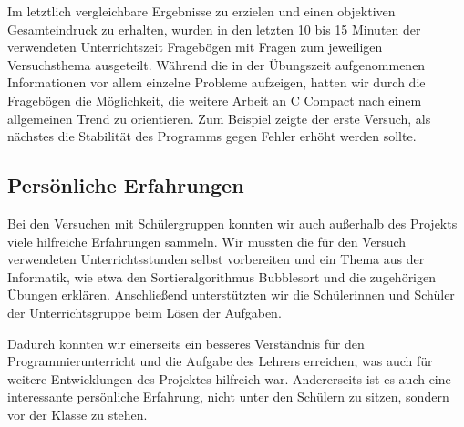 Im letztlich vergleichbare Ergebnisse zu erzielen und einen objektiven Gesamteindruck zu erhalten, wurden in den letzten 10 bis 15 Minuten der verwendeten Unterrichtszeit Fragebögen mit Fragen zum jeweiligen Versuchsthema ausgeteilt. Während die in der Übungszeit aufgenommenen Informationen vor allem einzelne Probleme aufzeigen, hatten wir durch die Fragebögen die Möglichkeit, die weitere Arbeit an C Compact nach einem allgemeinen Trend zu orientieren. Zum Beispiel zeigte der erste Versuch, als nächstes die Stabilität des Programms gegen Fehler erhöht werden sollte.

\subsection{Persönliche Erfahrungen}
Bei den Versuchen mit Schülergruppen konnten wir auch außerhalb des Projekts viele hilfreiche Erfahrungen sammeln. Wir mussten die für den Versuch verwendeten Unterrichtsstunden selbst vorbereiten und ein Thema aus der Informatik, wie etwa den Sortieralgorithmus \glqq{}Bubblesort\grqq{} und die zugehörigen Übungen erklären. Anschließend unterstützten wir die Schülerinnen und Schüler der Unterrichtsgruppe beim Lösen der Aufgaben.

Dadurch konnten wir einerseits ein besseres Verständnis für den Programmierunterricht und die Aufgabe des Lehrers erreichen, was auch für weitere Entwicklungen des Projektes hilfreich war. Andererseits ist es auch eine interessante persönliche Erfahrung, nicht unter den Schülern zu sitzen, sondern vor der Klasse zu stehen.
